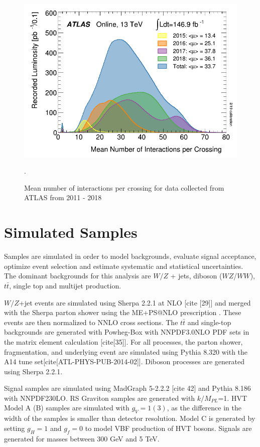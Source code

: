\begin{figure}[h!]
  \centering
  \includegraphics[width=\hsize]{figures/Analysis/mu_profile.png}
  \caption{Mean number of interactions per crossing for data collected from ATLAS from 2011 - 2018}. 
  \label{fig:mu_profile}
\end{figure} 
\FloatBarrier


\section{Simulated Samples}
\label{Simulated Samples}
Samples are simulated in order to model backgrounds, evaluate signal acceptance, optimize event selection and estimate systematic and statistical uncertainties. The dominant backgrounds for this analysis are $W/Z$ + jets, diboson ($WZ$/$WW$), $t\bar{t}$, single top and multijet production. 

$W/Z$+jet events are simulated using Sherpa 2.2.1 at NLO [cite [29]] and merged with the Sherpa parton shower using the ME+PS@NLO prescription \cite{me_ps}. These events are then normalized to NNLO cross sections. The $t\bar{t}$ and single-top backgrounds are generated with Powheg-Box with NNPDF3.0NLO PDF sets in the matrix element calculation [cite[35]]. For all processes, the parton shower, fragmentation, and underlying event are simulated using Pythia 8.320 with the A14 tune set[cite[ATL-PHYS-PUB-2014-02]]. Diboson processes are generated using Sherpa 2.2.1. 

Signal samples are simulated using MadGraph 5-2.2.2 [cite 42] and Pythia 8.186 with NNPDF230LO. RS Graviton samples are generated with $k/M_{PL}$=1. HVT Model A (B) samples are simulated with $g_{V}=1(3)$, as the difference in the width of the samples is smaller than detector resolution. Model C is generated by setting $g_{H}=1$ and $g_{f}=0$ to model VBF production of HVT bosons. Signals are generated for masses between 300 GeV and 5 TeV.

